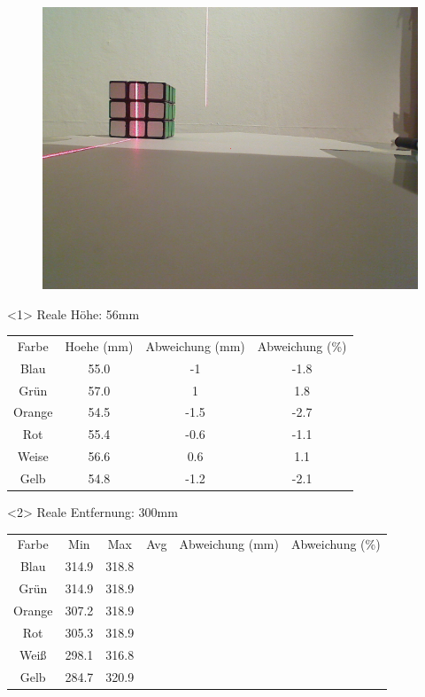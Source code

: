 \documentclass{beamer}
\begin{document}
\begin{frame}
\begin{figure}
\begin{minipage}{0.32\linewidth}
		\end{minipage}
		\hfill
		\begin{minipage}{0.32\linewidth}
			\includegraphics[width=\linewidth]{includes/test_color_3}
		\end{minipage}
	\end{figure}

	\begin{onlyenv}
		Reale Höhe: 56mm
		\begin{tabular}{c|c|c|c}
			Farbe & Hoehe (mm) & Abweichung (mm) & Abweichung (\%) \\
			Blau & 55.0 & -1 & -1.8\\
			Grün & 57.0 & 1 & 1.8\\
			Orange & 54.5 & -1.5 & -2.7\\
			Rot & 55.4 & -0.6 & -1.1\\
			Weise & 56.6 & 0.6 & 1.1\\
			Gelb & 54.8 & -1.2 & -2.1	
		\end{tabular}
	\end{onlyenv}
	\begin{onlyenv}
		Reale Entfernung: 300mm 
		\begin{tabular}{c|c|c|c|c|c}
			Farbe & Min & Max & Avg & Abweichung (mm) & Abweichung (\%)\\
			Blau & 314.9 & 318.8\\
			Grün & 314.9 & 318.9\\
			Orange & 307.2 & 318.9\\
			Rot & 305.3 & 318.9\\
			Weiß & 298.1 & 316.8\\
			Gelb & 284.7 & 320.9
		\end{tabular}
	\end{onlyenv}

\end{frame}
\end{document}
